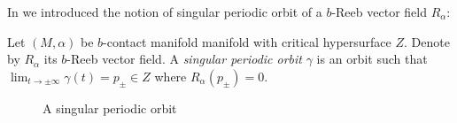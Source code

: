 In \cite{MO20} we introduced the notion of singular periodic orbit of a $b$-Reeb vector field $R_{\alpha}$:
\begin{definition}
		Let $(M,\alpha)$ be $b$-contact manifold manifold with critical hypersurface $Z$. Denote by $R_{\alpha}$ its $b$-Reeb vector field.  A \emph{singular periodic orbit} $\gamma$ is an orbit such that $\lim_{t \to  \pm \infty} \gamma(t) =p_{\pm} \in Z$ where $R_{\alpha}(p_{\pm})=0$.
	\end{definition}
	

	
	\begin{figure}[hbt!]\label{fig:singularorbit}
\begin{center}

\caption{A singular periodic orbit}

\end{center}
\end{figure}

